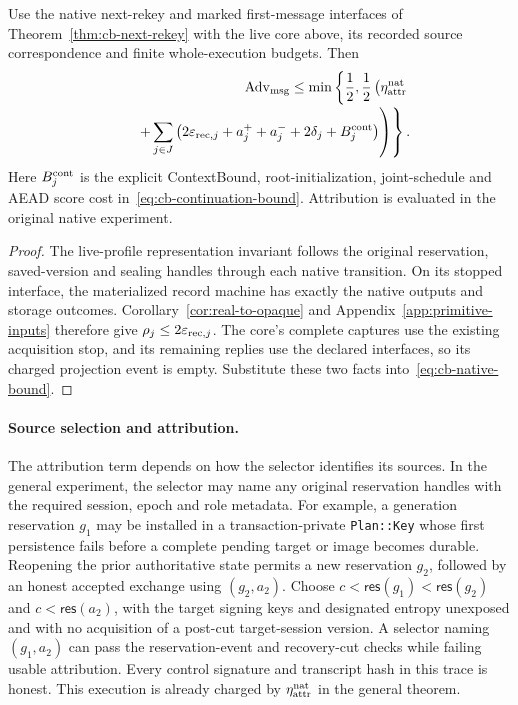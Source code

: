 \begin{corollary}
\label{cor:live-core-next-rekey}
Use the native next-rekey and marked first-message interfaces of
Theorem~\ref{thm:cb-next-rekey} with the live core above, its recorded source
correspondence and finite whole-execution budgets. Then
\begin{equation}
\begin{split}
 \operatorname{Adv}_{\rm msg}\le\min\left\{\frac12,
 \frac12\left(\eta_{\rm attr}^{\rm nat}\right.\right.\\[-2pt]
 \left.\left.\qquad+
 \sum_{j\in J}\left(2\varepsilon_{{\rm rec},j}
      +a_j^++a_j^-+2\delta_j+B_j^{\rm cont}\right)
 \right)\right\}.
\end{split}
\label{eq:live-core-next-rekey}
\end{equation}
Here $B_j^{\rm cont}$ is the explicit ContextBound, root-initialization,
joint-schedule and AEAD score cost in~\eqref{eq:cb-continuation-bound}.
Attribution is evaluated in the original native experiment.
\end{corollary}
\begin{proof}
The live-profile representation invariant follows the original reservation,
saved-version and sealing handles through each native transition. On its
stopped interface, the materialized record machine has exactly the native
outputs and storage outcomes. Corollary~\ref{cor:real-to-opaque} and
Appendix~\ref{app:primitive-inputs} therefore give
$\rho_j\le2\varepsilon_{{\rm rec},j}$. The core's complete captures use
the existing acquisition stop, and its remaining replies use the declared
interfaces, so its charged projection event is empty. Substitute these two
facts into~\eqref{eq:cb-native-bound}.
\end{proof}

\paragraph{Source selection and attribution.}
The attribution term depends on how the selector identifies its sources.
In the general experiment, the selector may name any original reservation handles with
the required session, epoch and role metadata. For example, a generation
reservation $g_1$ may be installed in a transaction-private
\texttt{Plan::Key} whose first persistence fails before a complete pending
target or image becomes durable. Reopening the prior
authoritative state permits a new reservation $g_2$, followed by an honest
accepted exchange using $(g_2,a_2)$. Choose
$c<\mathsf{res}(g_1)<\mathsf{res}(g_2)$ and
$c<\mathsf{res}(a_2)$, with the target signing keys and designated entropy
unexposed and with no acquisition of a post-cut target-session version.
A selector naming $(g_1,a_2)$ can pass
the reservation-event and recovery-cut checks while failing usable
attribution. Every control signature and transcript hash in this trace is
honest. This execution is already charged by
$\eta_{\rm attr}^{\rm nat}$ in the general theorem.

